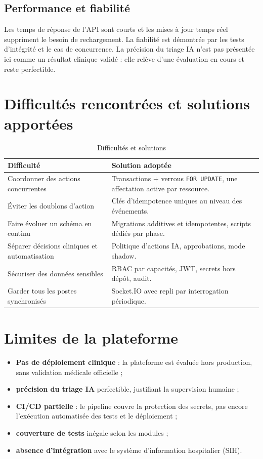 \subsection{Performance et fiabilité}

Les temps de réponse de l'API sont courts et les mises à jour temps réel suppriment le besoin de rechargement. La fiabilité est démontrée par les tests d'intégrité et le cas de concurrence. La précision du triage IA n'est pas présentée ici comme un résultat clinique validé : elle relève d'une évaluation en cours et reste perfectible.

\section{Difficultés rencontrées et solutions apportées}

\begin{table}[H]
\centering
\caption{Difficultés et solutions}
\label{tab:difficultes}
\small
\begin{tabular}{|p{4.6cm}|p{9cm}|}
\hline
\textbf{Difficulté} & \textbf{Solution adoptée} \\
\hline
Coordonner des actions concurrentes & Transactions + verrous \texttt{FOR UPDATE}, une affectation active par ressource. \\
\hline
Éviter les doublons d'action & Clés d'idempotence uniques au niveau des événements. \\
\hline
Faire évoluer un schéma en continu & Migrations additives et idempotentes, scripts dédiés par phase. \\
\hline
Séparer décisions cliniques et automatisation & Politique d'actions IA, approbations, mode shadow. \\
\hline
Sécuriser des données sensibles & RBAC par capacités, JWT, secrets hors dépôt, audit. \\
\hline
Garder tous les postes synchronisés & Socket.IO avec repli par interrogation périodique. \\
\hline
\end{tabular}
\end{table}

\section{Limites de la plateforme}

\begin{itemize}
    \item \textbf{Pas de déploiement clinique} : la plateforme est évaluée hors production, sans validation médicale officielle ;
    \item \textbf{précision du triage IA} perfectible, justifiant la supervision humaine ;
    \item \textbf{CI/CD partielle} : le pipeline couvre la protection des secrets, pas encore l'exécution automatisée des tests et le déploiement ;
    \item \textbf{couverture de tests} inégale selon les modules ;
    \item \textbf{absence d'intégration} avec le système d'information hospitalier (SIH).
\end{itemize}

